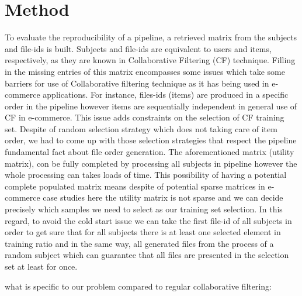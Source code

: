 \documentclass[10pt, conference, compsocconf]{IEEEtran}
\begin{document}






\section{Method}
To evaluate the reproducibility of a pipeline, a retrieved matrix from 
the subjects and file-ids is built. Subjects and file-ids are equivalent 
to users and items, respectively, as they are known in Collaborative Filtering (CF) technique.
Filling in the missing entries of this matrix encompasses some issues 
which take some barriers for use of Collaborative filtering technique as it 
has being used in e-commerce applications.
For instance, files-ids (items) are produced in a specific order in the 
pipeline however items are sequentially independent in general use of CF in e-commerce.
This issue adds constraints on the selection of CF training set. Despite of random 
selection strategy which does not taking care of item order, we had to come up with those 
selection strategies that respect the pipeline fundamental fact about file order generation.  
The aforementioned matrix (utility matrix), con be fully completed by processing all subjects 
in pipeline however the whole processing can takes loads of time. This possibility of 
having a potential complete populated matrix means despite of potential sparse matrices 
in e-commerce case studies here the utility matrix is not sparse and 
we can decide precisely which samples we need to select as our training set selection. 
In this regard, to avoid the cold start issue we can take the first file-id of all 
subjects in order to get sure that for all subjects there is at least one 
selected element in training ratio and in the same way, all generated files 
from the process of a random subject which can guarantee that all files 
are presented in the selection set at least for once. 
 

 
what is specific to our problem compared to regular collaborative filtering:
\end{document}
